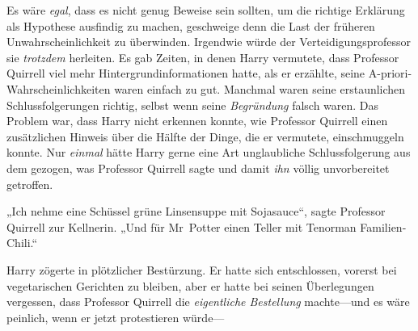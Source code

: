 Es wäre \emph{egal}, dass es nicht genug Beweise sein sollten, um die richtige Erklärung als Hypothese ausfindig zu machen, geschweige denn die Last der früheren Unwahrscheinlichkeit zu überwinden. Irgendwie würde der Verteidigungsprofessor sie \emph{trotzdem} herleiten. Es gab Zeiten, in denen Harry vermutete, dass Professor Quirrell viel mehr Hintergrundinformationen hatte, als er erzählte, seine A-priori-Wahrscheinlichkeiten waren einfach zu gut. Manchmal waren seine erstaunlichen Schlussfolgerungen richtig, selbst wenn seine \emph{Begründung} falsch waren. Das Problem war, dass Harry nicht erkennen konnte, wie Professor Quirrell einen zusätzlichen Hinweis über die Hälfte der Dinge, die er vermutete, einschmuggeln konnte. Nur \emph{einmal} hätte Harry gerne eine Art unglaubliche Schlussfolgerung aus dem gezogen, was Professor Quirrell sagte und damit \emph{ihn} völlig unvorbereitet getroffen.

\later

„Ich nehme eine Schüssel grüne Linsensuppe mit Sojasauce“, sagte Professor Quirrell zur Kellnerin. „Und für Mr~Potter einen Teller mit Tenorman Familien-Chili.“

Harry zögerte in plötzlicher Bestürzung. Er hatte sich entschlossen, vorerst bei vegetarischen Gerichten zu bleiben, aber er hatte bei seinen Überlegungen vergessen, dass Professor Quirrell die \emph{eigentliche Bestellung} machte—und es wäre peinlich, wenn er jetzt protestieren würde—

